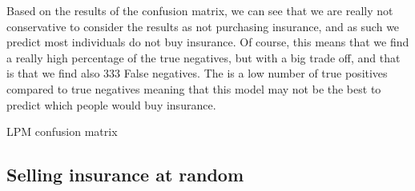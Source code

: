 \documentclass{article}
\begin{document}
Based on the results of the confusion matrix, we can see that we are really not conservative to consider the results as not purchasing insurance, and as such we predict most individuals do not buy insurance. Of course, this means that we find a really high percentage of the true negatives, but with a big trade off, and that is that we find also 333 False negatives. The is a low number of true positives compared to true negatives meaning that this model may not be the best to predict which people would buy insurance.\\
\newline

\begin{table}[!htb]
\caption{LPM confusion matrix}
\label{model1}
\begin{center}


\end{center}
\end{table}





\subsection{Selling insurance at random}
\end{document}

